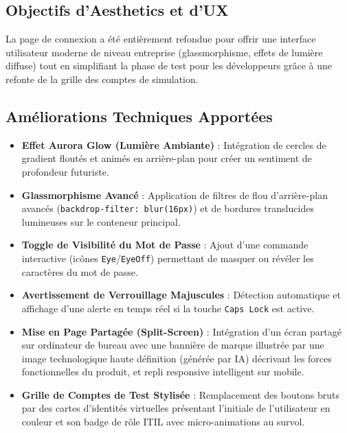 \documentclass[12pt,a4paper]{article}
\begin{document}
\subsection{Objectifs d'Aesthetics et d'UX}
La page de connexion a été entièrement refondue pour offrir une interface utilisateur moderne de niveau entreprise (glassmorphisme, effets de lumière diffuse) tout en simplifiant la phase de test pour les développeurs grâce à une refonte de la grille des comptes de simulation.

\subsection{Améliorations Techniques Apportées}
\begin{itemize}
    \item \textbf{Effet Aurora Glow (Lumière Ambiante)} : Intégration de cercles de gradient floutés et animés en arrière-plan pour créer un sentiment de profondeur futuriste.
    \item \textbf{Glassmorphisme Avancé} : Application de filtres de flou d'arrière-plan avancés (\texttt{backdrop-filter: blur(16px)}) et de bordures translucides lumineuses sur le conteneur principal.
    \item \textbf{Toggle de Visibilité du Mot de Passe} : Ajout d'une commande interactive (icônes \texttt{Eye}/\texttt{EyeOff}) permettant de masquer ou révéler les caractères du mot de passe.
    \item \textbf{Avertissement de Verrouillage Majuscules} : Détection automatique et affichage d'une alerte en temps réel si la touche \texttt{Caps Lock} est active.
    \item \textbf{Mise en Page Partagée (Split-Screen)} : Intégration d'un écran partagé sur ordinateur de bureau avec une bannière de marque illustrée par une image technologique haute définition (générée par IA) décrivant les forces fonctionnelles du produit, et repli responsive intelligent sur mobile.
    \item \textbf{Grille de Comptes de Test Stylisée} : Remplacement des boutons bruts par des cartes d'identités virtuelles présentant l'initiale de l'utilisateur en couleur et son badge de rôle ITIL avec micro-animations au survol.
\end{itemize}
\end{document}
